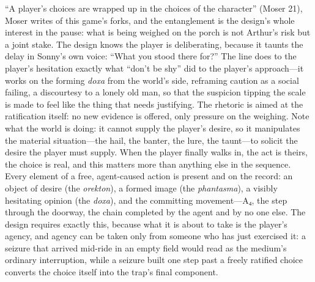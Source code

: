 ``A player's choices are wrapped up in the choices of the character'' (Moser 21), Moser writes of this game's forks, and the entanglement is the design's whole interest in the pause: what is being weighed on the porch is not Arthur's risk but a joint stake. The design knows the player is deliberating, because it taunts the delay in Sonny's own voice: ``What you stood there for?'' The line does to the player's hesitation exactly what ``don't be shy'' did to the player's approach---it works on the forming \textit{doxa} from the world's side, reframing caution as a social failing, a discourtesy to a lonely old man, so that the suspicion tipping the scale is made to feel like the thing that needs justifying. The rhetoric is aimed at the ratification itself: no new evidence is offered, only pressure on the weighing. Note what the world is doing: it cannot supply the player's desire, so it manipulates the material situation---the hail, the banter, the lure, the taunt---to solicit the desire the player must supply. When the player finally walks in, the act is theirs, the choice is real, and this matters more than anything else in the sequence. Every element of a free, agent-caused action is present and on the record: an object of desire (the \textit{orekton}), a formed image (the \textit{phantasma}), a visibly hesitating opinion (the \textit{doxa}), and the committing movement---A₄, the step through the doorway, the chain completed by the agent and by no one else. The design requires exactly this, because what it is about to take is the player's agency, and agency can be taken only from someone who has just exercised it: a seizure that arrived mid-ride in an empty field would read as the medium's ordinary interruption, while a seizure built one step past a freely ratified choice converts the choice itself into the trap's final component.

